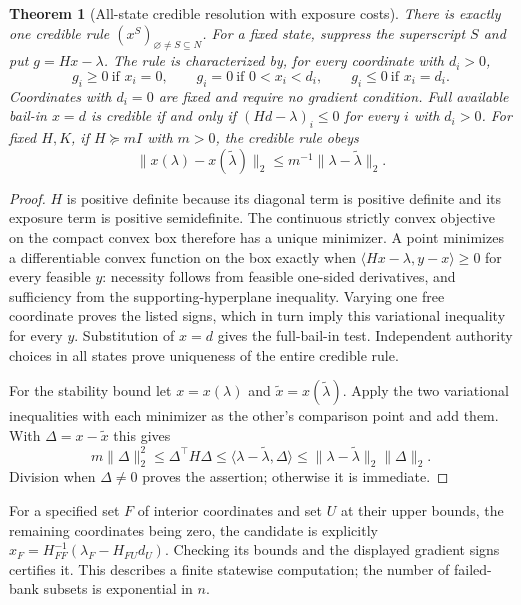 \documentclass[11pt]{article}
\newtheorem{theorem}{Theorem}
\theoremstyle{definition}
\begin{document}
\begin{theorem}[All-state credible resolution with exposure costs]
There is exactly one credible rule $(x^S)_{\varnothing\ne S\subseteq N}$.
For a fixed state, suppress the superscript $S$ and put $g=Hx-\lambda$.
The rule is characterized by, for every coordinate with $d_i>0$,
\[
 g_i\geq0\ \text{if }x_i=0,\qquad
 g_i=0\ \text{if }0<x_i<d_i,\qquad
 g_i\leq0\ \text{if }x_i=d_i.
\]
Coordinates with $d_i=0$ are fixed and require no gradient condition.
Full available bail-in $x=d$ is credible if and only if
$(Hd-\lambda)_i\leq0$ for every $i$ with $d_i>0$.
For fixed $H,K$, if $H\succeq mI$ with $m>0$, the credible rule obeys
\[
 \|x(\lambda)-x(\widetilde\lambda)\|_2
       \leq m^{-1}\|\lambda-\widetilde\lambda\|_2.
\]
\end{theorem}
\begin{proof}
$H$ is positive definite because its diagonal term is positive definite and
its exposure term is positive semidefinite. The continuous strictly convex
objective on the compact convex box therefore has a unique minimizer.
A point minimizes a differentiable convex function on the box exactly when
$\langle Hx-\lambda,y-x\rangle\geq0$ for every feasible $y$:
necessity follows from feasible one-sided derivatives, and sufficiency from
the supporting-hyperplane inequality. Varying one free coordinate proves the
listed signs, which in turn imply this variational inequality for every $y$.
Substitution of $x=d$ gives the full-bail-in test. Independent authority choices
in all states prove uniqueness of the entire credible rule.

For the stability bound let $x=x(\lambda)$ and
$\widetilde x=x(\widetilde\lambda)$. Apply the two variational inequalities
with each minimizer as the other's comparison point and add them. With
$\Delta=x-\widetilde x$ this gives
\[
 m\|\Delta\|_2^2\leq\Delta^\top H\Delta
          \leq\langle\lambda-\widetilde\lambda,\Delta\rangle
          \leq\|\lambda-\widetilde\lambda\|_2\|\Delta\|_2.
\]
Division when $\Delta\ne0$ proves the assertion; otherwise it is immediate.
\end{proof}
For a specified set $F$ of interior coordinates and set $U$ at their upper
bounds, the remaining coordinates being zero, the candidate is explicitly
$x_F=H_{FF}^{-1}(\lambda_F-H_{FU}d_U)$. Checking its bounds and the displayed
gradient signs certifies it. This describes a finite statewise computation;
the number of failed-bank subsets is exponential in $n$.
\end{document}
